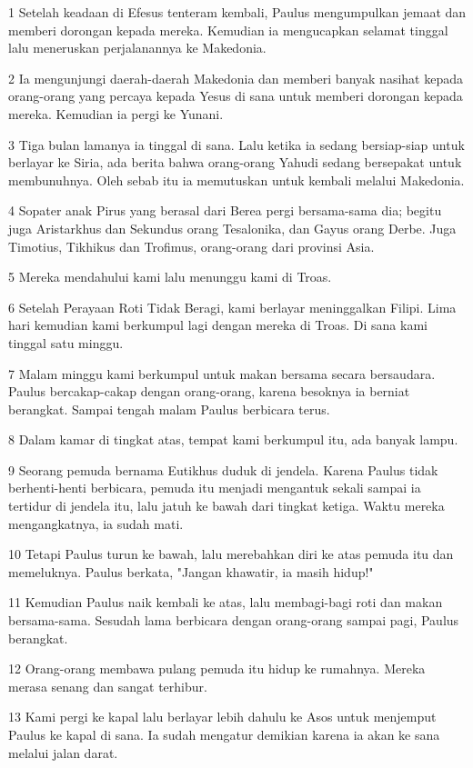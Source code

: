 \par 1 Setelah keadaan di Efesus tenteram kembali, Paulus mengumpulkan jemaat dan memberi dorongan kepada mereka. Kemudian ia mengucapkan selamat tinggal lalu meneruskan perjalanannya ke Makedonia.
\par 2 Ia mengunjungi daerah-daerah Makedonia dan memberi banyak nasihat kepada orang-orang yang percaya kepada Yesus di sana untuk memberi dorongan kepada mereka. Kemudian ia pergi ke Yunani.
\par 3 Tiga bulan lamanya ia tinggal di sana. Lalu ketika ia sedang bersiap-siap untuk berlayar ke Siria, ada berita bahwa orang-orang Yahudi sedang bersepakat untuk membunuhnya. Oleh sebab itu ia memutuskan untuk kembali melalui Makedonia.
\par 4 Sopater anak Pirus yang berasal dari Berea pergi bersama-sama dia; begitu juga Aristarkhus dan Sekundus orang Tesalonika, dan Gayus orang Derbe. Juga Timotius, Tikhikus dan Trofimus, orang-orang dari provinsi Asia.
\par 5 Mereka mendahului kami lalu menunggu kami di Troas.
\par 6 Setelah Perayaan Roti Tidak Beragi, kami berlayar meninggalkan Filipi. Lima hari kemudian kami berkumpul lagi dengan mereka di Troas. Di sana kami tinggal satu minggu.
\par 7 Malam minggu kami berkumpul untuk makan bersama secara bersaudara. Paulus bercakap-cakap dengan orang-orang, karena besoknya ia berniat berangkat. Sampai tengah malam Paulus berbicara terus.
\par 8 Dalam kamar di tingkat atas, tempat kami berkumpul itu, ada banyak lampu.
\par 9 Seorang pemuda bernama Eutikhus duduk di jendela. Karena Paulus tidak berhenti-henti berbicara, pemuda itu menjadi mengantuk sekali sampai ia tertidur di jendela itu, lalu jatuh ke bawah dari tingkat ketiga. Waktu mereka mengangkatnya, ia sudah mati.
\par 10 Tetapi Paulus turun ke bawah, lalu merebahkan diri ke atas pemuda itu dan memeluknya. Paulus berkata, "Jangan khawatir, ia masih hidup!"
\par 11 Kemudian Paulus naik kembali ke atas, lalu membagi-bagi roti dan makan bersama-sama. Sesudah lama berbicara dengan orang-orang sampai pagi, Paulus berangkat.
\par 12 Orang-orang membawa pulang pemuda itu hidup ke rumahnya. Mereka merasa senang dan sangat terhibur.
\par 13 Kami pergi ke kapal lalu berlayar lebih dahulu ke Asos untuk menjemput Paulus ke kapal di sana. Ia sudah mengatur demikian karena ia akan ke sana melalui jalan darat.
